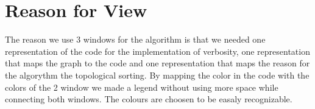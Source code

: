 \section{Reason for View}
The reason we use 3 windows for the algorithm is that we needed one representation of the code for the implementation of verbosity, one representation that maps the graph to the code and one representation that maps the reason for the algorythm the topological sorting. By mapping the color in the code with the colors of the 2 window we made a legend without using more space while connecting both windows. The colours are choosen to be easaly recognizable.


